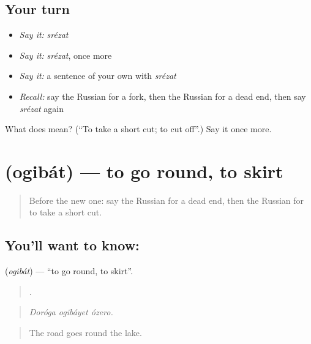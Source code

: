\subsection*{Your turn}
\begin{itemize}
\raggedright
  \item \emph{Say it:} \emph{srézat}
  \item \emph{Say it:} \emph{srézat}, once more
  \item \emph{Say it:} a sentence of your own with \emph{srézat}
  \item \emph{Recall:} say the Russian for a fork, then the Russian for a dead end, then say \emph{srézat} again
\end{itemize}

\begin{tcolorbox}[breakable,colback=teal!4,colframe=teal!35!black,title={Before you move on}]
What does  mean? (\textquotedblleft{}To take a short cut; to cut off\textquotedblright{}.) Say it once more.
\end{tcolorbox}
\section[\texorpdfstring{\ru{огибать} (ogibát)}{огибать (ogibát)}]{ (ogibát) — to go round, to skirt}

\label{lesson:RU-C439-ogibat}



\begin{quote}
Before the new one: say the Russian for a dead end, then the Russian for to take a short cut.
\end{quote}

\subsection*{You'll want to know: }
\textbf{} (\emph{ogibát}) — \textquotedblleft{}to go round, to skirt\textquotedblright{}.

\begin{quote}
  .
\end{quote}

\begin{quote}
\emph{Doróga ogibáyet ózero.}
\end{quote}

\begin{quote}
The road goes round the lake.
\end{quote}

